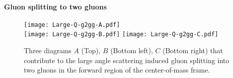 \begin{appendices}
\paragraph*{Gluon splitting to two gluons}
\begin{figure}
\singlespacing
\centering
\texttt{[image: Large-Q-g2gg-A.pdf]}\\
\vspace{1em}
\texttt{[image: Large-Q-g2gg-B.pdf]}\hfill
\texttt{[image: Large-Q-g2gg-C.pdf]}
\caption[Three diagrams $A$ (Top), $B$ (Bottom left), $C$ (Bottom right) that]{Three diagrams $A$ (Top), $B$ (Bottom left), $C$ (Bottom right) that contribute to the large angle scattering induced gluon splitting into two gluons in the forward region of the center-of-mass frame.}
\label{fig:feyn-g2gg}
\end{figure}


\end{appendices}
